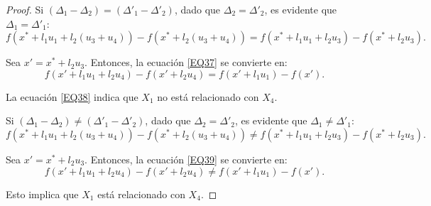 \begin{proof}

Si \( (\Delta_1 - \Delta_2) = (\Delta'_1 - \Delta'_2) \), dado que \( \Delta_2 = \Delta'_2 \), es evidente que \( \Delta_1 = \Delta'_1 \):
\begin{equation}
f(x^* + l_1 u_1 + l_2(u_3 + u_4)) - f(x^* + l_2(u_3 + u_4)) = f(x^* + l_1 u_1 + l_2 u_3) - f(x^* + l_2 u_3).
\label{EQ37}
\end{equation}

Sea \( x' = x^* + l_2 u_3 \). Entonces, la ecuación \eqref{EQ37} se convierte en:
\begin{equation}
f(x' + l_1 u_1 + l_2 u_4) - f(x' + l_2 u_4) = f(x' + l_1 u_1) - f(x').
\label{EQ38}
\end{equation}

La ecuación \eqref{EQ38} indica que \( X_1 \) no está relacionado con \( X_4 \).

Si \( (\Delta_1 - \Delta_2) \neq (\Delta'_1 - \Delta'_2) \), dado que \( \Delta_2 = \Delta'_2 \), es evidente que \( \Delta_1 \neq \Delta'_1 \):
\begin{equation}
f(x^* + l_1 u_1 + l_2(u_3 + u_4)) - f(x^* + l_2(u_3 + u_4)) \neq f(x^* + l_1 u_1 + l_2 u_3) - f(x^* + l_2 u_3).
\label{EQ39}
\end{equation}

Sea \( x' = x^* + l_2 u_3 \). Entonces, la ecuación \eqref{EQ39} se convierte en:
\begin{equation}
f(x' + l_1 u_1 + l_2 u_4) - f(x' + l_2 u_4) \neq f(x' + l_1 u_1) - f(x').
\label{EQ40}
\end{equation}

Esto implica que \( X_1 \) está relacionado con \( X_4 \).

\end{proof}





\endinput
